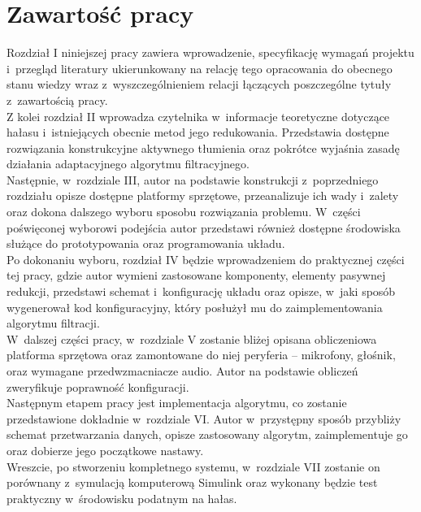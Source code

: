 \section{Zawartość pracy}
\label{sec:zawartoscPracy}
Rozdział I niniejszej pracy zawiera wprowadzenie, specyfikację wymagań projektu i~przegląd literatury ukierunkowany na relację tego opracowania do obecnego stanu wiedzy wraz z~wyszczególnieniem relacji łączących poszczególne tytuły z~zawartością pracy.\\

Z kolei rozdział II wprowadza czytelnika w~informacje teoretyczne dotyczące hałasu i~istniejących obecnie metod jego redukowania. Przedstawia dostępne rozwiązania konstrukcyjne aktywnego tłumienia oraz pokrótce wyjaśnia zasadę działania adaptacyjnego algorytmu filtracyjnego.\\

Następnie, w~rozdziale III, autor na podstawie konstrukcji z~poprzedniego rozdziału opisze dostępne platformy sprzętowe, przeanalizuje ich wady i~zalety oraz dokona dalszego wyboru sposobu rozwiązania problemu. W~części poświęconej wyborowi podejścia autor przedstawi również dostępne środowiska służące do prototypowania oraz programowania układu.\\

Po dokonaniu wyboru, rozdział IV będzie wprowadzeniem do praktycznej części tej pracy, gdzie autor wymieni zastosowane komponenty, elementy pasywnej redukcji, przedstawi schemat i~konfigurację układu oraz opisze, w~jaki sposób wygenerował kod konfiguracyjny, który posłużył mu do zaimplementowania algorytmu filtracji.\\

W~dalszej części pracy, w~rozdziale V zostanie bliżej opisana obliczeniowa platforma sprzętowa oraz zamontowane do niej peryferia -- mikrofony, głośnik, oraz wymagane przedwzmacniacze audio. Autor na podstawie obliczeń zweryfikuje poprawność konfiguracji.\\

Następnym etapem pracy jest implementacja algorytmu, co zostanie przedstawione dokładnie w~rozdziale VI. Autor w~przystępny sposób przybliży schemat przetwarzania danych, opisze zastosowany algorytm, zaimplementuje go oraz dobierze jego początkowe nastawy.\\

Wreszcie, po stworzeniu kompletnego systemu, w~rozdziale VII zostanie on porównany z~symulacją komputerową Simulink oraz wykonany będzie test praktyczny w~środowisku podatnym na hałas.\\

